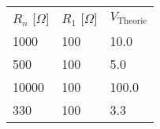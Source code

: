 \begin{tabular}{lll}
\hline
 $R_n$ [$\Omega$] & $R_1$ [$\Omega$] & $V_\text{Theorie}$ \\
 1000             & 100              & 10.0               \\
 500              & 100              & 5.0                \\
 10000            & 100              & 100.0              \\
 330              & 100              & 3.3                \\
\hline
\end{tabular}
